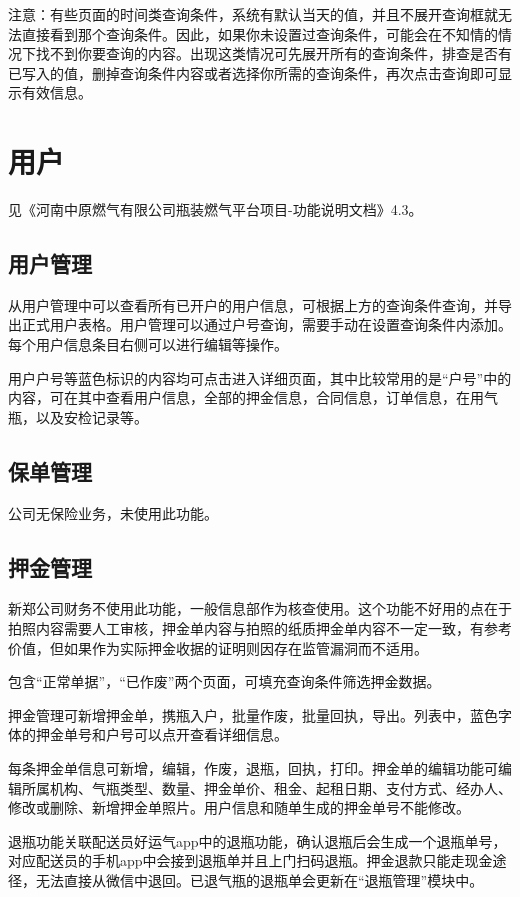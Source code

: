 \documentclass[UTF8]{ctexart}
\begin{document}
注意：有些页面的时间类查询条件，系统有默认当天的值，并且不展开查询框就无法直接看到那个查询条件。因此，如果你未设置过查询条件，可能会在不知情的情况下找不到你要查询的内容。出现这类情况可先展开所有的查询条件，排查是否有已写入的值，删掉查询条件内容或者选择你所需的查询条件，再次点击查询即可显示有效信息。

\section{用户}

见《河南中原燃气有限公司瓶装燃气平台项目-功能说明文档》4.3。

\subsection{用户管理}
从用户管理中可以查看所有已开户的用户信息，可根据上方的查询条件查询，并导出正式用户表格。用户管理可以通过户号查询，需要手动在设置查询条件内添加。每个用户信息条目右侧可以进行编辑等操作。

用户户号等蓝色标识的内容均可点击进入详细页面，其中比较常用的是“户号”中的内容，可在其中查看用户信息，全部的押金信息，合同信息，订单信息，在用气瓶，以及安检记录等。

\subsection{保单管理}
公司无保险业务，未使用此功能。

\subsection{押金管理}
新郑公司财务不使用此功能，一般信息部作为核查使用。这个功能不好用的点在于拍照内容需要人工审核，押金单内容与拍照的纸质押金单内容不一定一致，有参考价值，但如果作为实际押金收据的证明则因存在监管漏洞而不适用。

包含“正常单据”，“已作废”两个页面，可填充查询条件筛选押金数据。

押金管理可新增押金单，携瓶入户，批量作废，批量回执，导出。列表中，蓝色字体的押金单号和户号可以点开查看详细信息。

每条押金单信息可新增，编辑，作废，退瓶，回执，打印。押金单的编辑功能可编辑所属机构、气瓶类型、数量、押金单价、租金、起租日期、支付方式、经办人、修改或删除、新增押金单照片。用户信息和随单生成的押金单号不能修改。

退瓶功能关联配送员好运气app中的退瓶功能，确认退瓶后会生成一个退瓶单号，对应配送员的手机app中会接到退瓶单并且上门扫码退瓶。押金退款只能走现金途径，无法直接从微信中退回。已退气瓶的退瓶单会更新在“退瓶管理”模块中。
\end{document}
